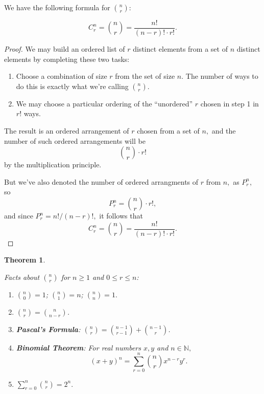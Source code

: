 \documentclass[
]{book}
\providecommand{\tightlist}{%
  \setlength{\itemsep}{0pt}\setlength{\parskip}{0pt}}
\newtheorem{theorem}{Theorem}[chapter]
\theoremstyle{definition}
\theoremstyle{definition}
\theoremstyle{definition}
\theoremstyle{definition}
\theoremstyle{remark}
\begin{document}
We have the following formula for \(\displaystyle \binom{n}{r}\):

\begin{equation} 
  C^n_r = \binom{n}{r} = \frac{n!}{(n-r)!\cdot r!}.
  \label{eq:Cnr}
\end{equation}

\begin{proof}
We may build an ordered list of \(r\) distinct elements from a set of \(n\) distinct elements by completing these two tasks:

\begin{enumerate}
\def\labelenumi{\arabic{enumi}.}
\tightlist
\item
  Choose a combination of size \(r\) from the set of size \(n\). The number of ways to do this is exactly what we're calling \(\binom{n}{r}\).
\item
  We may choose a particular ordering of the ``unordered'' \(r\) chosen in step 1 in \(r!\) ways.
\end{enumerate}

The result is an ordered arrangement of \(r\) chosen from a set of \(n,\) and the number of such ordered arrangements will be \[\binom{n}{r} \cdot r!\] by the multiplication principle.

But we've also denoted the number of ordered arrangments of \(r\) from \(n,\) as \(P^n_r,\) so \[P^n_r = \binom{n}{r} \cdot r!,\] and since \(P^n_r = n!/(n-r)!,\) it follows that
\[C^n_r = \binom{n}{r} = \frac{n!}{(n-r)!\cdot r!}.\]
\end{proof}

\begin{theorem}
\protect\hypertarget{thm:Cnrfacts}{}\label{thm:Cnrfacts}

Facts about \(\displaystyle \binom{n}{r}\) for \(n \geq 1\) and \(0 \leq r \leq n\):

\begin{enumerate}
\def\labelenumi{\arabic{enumi}.}
\tightlist
\item
  \(\displaystyle \binom{n}{0} = 1\); \(\displaystyle \binom{n}{1}=n\); \(\displaystyle \binom{n}{n}=1.\)
\item
  \(\displaystyle \binom{n}{r} = \binom{n}{n-r}\).
\item
  \textbf{Pascal's Formula}: \(\displaystyle \binom{n}{r} = \binom{n-1}{r-1} + \binom{n-1}{r}\).
\item
  \textbf{Binomial Theorem}: For real numbers \(x, y\) and \(n\in\mathbb{N},\) \[(x+y)^n = \sum_{r=0}^n \binom{n}{r}x^{n-r}y^r.\]
\item
  \(\displaystyle \sum_{r = 0}^n \binom{n}{r} = 2^n.\)
\end{enumerate}

\end{theorem}
\end{document}
